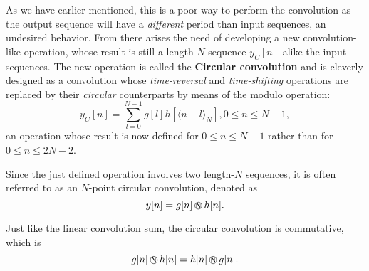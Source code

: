 \documentclass[\documentfontsize, twocolumn]{\classname}
\begin{document}
As we have earlier mentioned, this is a poor way to perform the convolution as the output sequence will have a \emph{different} period than input sequences, an undesired behavior. From there arises the need of developing a new convolution-like operation, whose result is still a length-$N$ sequence $y_C[n]$ alike the input sequences. The new operation is called the \textbf{Circular convolution} and is cleverly designed as a convolution whose \emph{time-reversal} and \emph{time-shifting} operations are replaced by their \emph{circular} counterparts by means of the modulo operation:
\begin{equation}\label{eqn:circularConvolution}
    y_C[n] = \sum_{l=0}^{N-1} g[l]h[\langle n-l \rangle_N], 0 \leq n \leq N-1,
\end{equation}
an operation whose result is now defined for $0 \leq n \leq N-1$ rather than for $0 \leq n \leq 2N-2$.

Since the just defined operation involves two length-$N$ sequences, it is often referred to as an $N$-point circular convolution, denoted as
\begin{equation}\label{eqn:circularConvolutionSymbol}
    y[n] = g[n] \encircle{N}  h[n].
\end{equation}

Just like the linear convolution sum, the circular convolution is commutative, which is
\[
    g[n] \encircle{N} h[n] = h[n] \encircle{N} g[n].
\]
\end{document}
